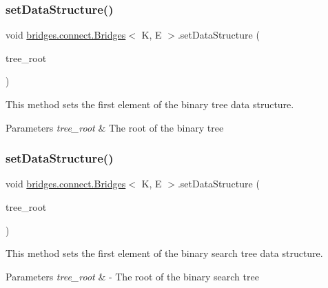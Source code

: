 \subsubsection{\texorpdfstring{set\+Data\+Structure()}{setDataStructure()}\hspace{0.1cm}{\footnotesize\ttfamily [8/12]}}
{\footnotesize\ttfamily void \hyperlink{classbridges_1_1connect_1_1_bridges}{bridges.\+connect.\+Bridges}$<$ K, E $>$.set\+Data\+Structure (\begin{DoxyParamCaption}\item[{\hyperlink{classbridges_1_1base_1_1_bin_tree_element}{Bin\+Tree\+Element}$<$ E $>$}]{tree\+\_\+root }\end{DoxyParamCaption})}

This method sets the first element of the binary tree data structure.


\begin{DoxyParams}{Parameters}
{\em tree\+\_\+root} & The root of the binary tree \\
\hline
\end{DoxyParams}
\hypertarget{classbridges_1_1connect_1_1_bridges_adb01a9385de48ef267bdfd22758fb361}{}\label{classbridges_1_1connect_1_1_bridges_adb01a9385de48ef267bdfd22758fb361} 
\subsubsection{\texorpdfstring{set\+Data\+Structure()}{setDataStructure()}\hspace{0.1cm}{\footnotesize\ttfamily [9/12]}}
{\footnotesize\ttfamily void \hyperlink{classbridges_1_1connect_1_1_bridges}{bridges.\+connect.\+Bridges}$<$ K, E $>$.set\+Data\+Structure (\begin{DoxyParamCaption}\item[{\hyperlink{classbridges_1_1base_1_1_b_s_t_element}{B\+S\+T\+Element}$<$ K, E $>$}]{tree\+\_\+root }\end{DoxyParamCaption})}

This method sets the first element of the binary search tree data structure.


\begin{DoxyParams}{Parameters}
{\em tree\+\_\+root} & -\/ The root of the binary search tree \\
\hline
\end{DoxyParams}
\hypertarget{classbridges_1_1connect_1_1_bridges_a702c3f88840e100ad0182110627e60f5}{}\label{classbridges_1_1connect_1_1_bridges_a702c3f88840e100ad0182110627e60f5} 
